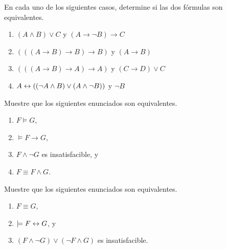 \documentclass[12pt,a4paper]{book}
\begin{document}
    \begin{ejercicio}
        En cada uno de los siguientes casos, determine si las dos fórmulas son equivalentes.
        \begin{enumerate}[label=(\alph*)]
            \item $(A\wedge B)\vee C$ y $(A\rightarrow\neg B)\rightarrow C$
            \item $(((A\rightarrow B)\rightarrow B)\rightarrow B)$ y $(A\rightarrow B)$
            \item $(((A\rightarrow B)\rightarrow A)\rightarrow A)$ y $(C\rightarrow D)\vee C$
            \item $A\leftrightarrow((\neg A\wedge B)\vee(A\wedge\neg B))$ y $\neg B$
        \end{enumerate}
    \end{ejercicio}

    \begin{ejercicio}
        Muestre que los siguientes enunciados son equivalentes.
        \begin{enumerate}
            \item[1.] $F\models G$,
            \item[2.] $\models F\rightarrow G$,
            \item[3.] $F\wedge\neg G$ es insatisfacible, y
            \item[4.] $F\equiv F\wedge G$.
        \end{enumerate}
    \end{ejercicio}

    \begin{ejercicio}
        Muestre que los siguientes enunciados son equivalentes.
        \begin{enumerate}
            \item[1.] $F\equiv G$,
            \item[2.] $\models F\leftrightarrow G$, y
            \item[3.] $(F\wedge\neg G)\vee(\neg F\wedge G)$ es insatisfacible.
        \end{enumerate}
    \end{ejercicio}
\end{document}
